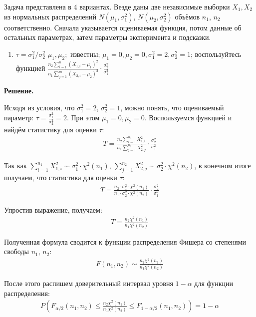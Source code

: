 \documentclass[12pt]{article}
\begin{document}
	Задача представлена в 4 вариантах. Везде даны две независимые выборки $X_1, X_2$ из нормальных распределений $N(\mu_1, \sigma^2_1)$, $N(\mu_2, \sigma^2_2)$ объёмов $n_1$, $n_2$ соответственно. Сначала указывается оцениваемая функция, потом данные об остальных параметрах, затем параметры эксперимента и подсказки.
	
	\begin{enumerate}
		\centering
		\setcounter{enumi}{3}
		\item $ \tau = \sigma_1^2 / \sigma_2^2
		$ $\mu_1, \mu_2;$ известны;
		$\mu_1 = 0, \mu_2 = 0, \sigma_1^2 = 2, \sigma_2^2 = 1$; воспользуйтесь функцией  
		$
		\frac{n_2 \sum\limits_{i=1}^{n} (X_{1, i} - \mu_1)^2}{n_1 \sum\limits_{j=1}^{m} (X_{2,i} - \mu_2)^2} \cdot \frac{\sigma_2^2}{\sigma_1^2}
		$
	\end{enumerate}
	\vspace{1em}
	
	\textbf{Решение.}
	
	Исходя из условия, что $\sigma_1^2 = 2$, $\sigma_2^2 = 1$, можно понять, что оцениваемый параметр: $\tau = \frac{\sigma_1^2}{\sigma_2^2} = 2$. При этом $\mu_1 = 0, \mu_2 = 0$. Воспользуемся функцией и найдём статистику для оценки $\tau$:
	\begin{gather*}
		T = \frac{n_2 \sum_{i=1}^{n_1} X_{1,i}^2}{n_1 \sum_{j=1}^{n_2} X_{2,j}^2} \cdot \frac{\sigma_2^2}{\sigma_1^2}
	\end{gather*}
	
	Так как $\sum_{i=1}^{n_1} X_{1,i}^2 \sim \sigma_1^2 \cdot \chi^2(n_1)$, $\sum_{j=1}^{n_2} X_{2,j}^2 \sim \sigma_2^2 \cdot \chi^2(n_2)$, в конечном итоге получаем, что статистика для оценки $\tau$:
	\begin{gather*}
		T = \frac{n_2 \cdot \sigma_1^2 \cdot \chi^2(n_1)}{n_1 \cdot \sigma_2^2 \cdot \chi^2(n_2)} \cdot \frac{\sigma_2^2}{\sigma_1^2}
	\end{gather*}
	
	Упростив выражение, получаем:
	\begin{gather*}
		T = \frac{n_2 \chi^2(n_1)}{n_1 \chi^2(n_2)}
	\end{gather*}
	
	Полученная формула сводится к функции распределения Фишера со степенями свободы $n_1$, $n_2$:
	\begin{gather*}
		F(n_1, n_2) \sim \frac{n_2 \chi^2(n_1)}{n_1 \chi^2(n_2)}
	\end{gather*}
	
	После этого распишем доверительный интервал уровня $1 - \alpha$ для функции распределения:
	\begin{gather*}
		P\left( F_{\alpha/2}(n_1, n_2) \leq \frac{n_2 \chi^2(n_1)}{n_1 \chi^2(n_2)} \leq F_{1 - \alpha/2}(n_1, n_2) \right) = 1 - \alpha
	\end{gather*}
	
\end{document}

